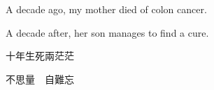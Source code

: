 A decade ago, my mother died of colon cancer.

A decade after, her son manages to find a cure.

\hfill \break

十年生死兩茫茫

不思量　自難忘
